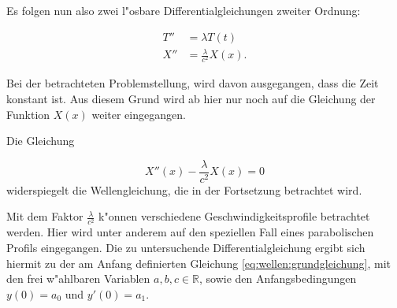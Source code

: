 Es folgen nun also zwei l"osbare Differentialgleichungen zweiter Ordnung:

\begin{align*}
	T'' &= \lambda T(t) \\
	X'' &= \frac{\lambda}{c^2}X(x).
\end{align*}

Bei der betrachteten Problemstellung, wird davon ausgegangen, dass die 
Zeit konstant ist. Aus diesem Grund wird ab hier nur noch auf die Gleichung 
der Funktion $X(x)$ weiter eingegangen.

Die Gleichung

\begin{equation*}
	X''(x) - \frac{\lambda}{c^2} X(x) = 0
\end{equation*}
widerspiegelt die Wellengleichung, die in der Fortsetzung betrachtet wird.

Mit dem Faktor $\frac{\lambda}{c^2}$ k"onnen verschiedene 
Geschwindigkeitsprofile betrachtet werden. Hier wird unter anderem auf den 
speziellen Fall eines parabolischen Profils eingegangen. Die zu untersuchende 
Differentialgleichung ergibt sich hiermit zu der am Anfang definierten 
Gleichung \ref{eq:wellen:grundgleichung}, mit den frei w"ahlbaren Variablen 
${a,b,c} \in \mathbb{R}$, sowie den Anfangsbedingungen $y(0) = a_0$ und $y'(0) 
= a_1$.